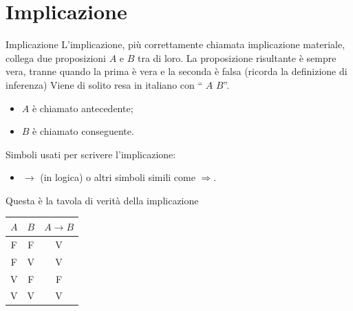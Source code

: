 \documentclass[10pt,dvipsnames,handout]{beamer}
\begin{document}



\section{Implicazione}

\begin{frame}{Implicazione}
    L'\alert{implicazione}, più correttamente chiamata \alert{implicazione materiale}, collega due proposizioni $A$ e $B$ tra di loro. La proposizione risultante è sempre vera, tranne quando la prima è vera e la seconda è falsa (ricorda la definizione di inferenza)
    \medskip
    Viene di solito resa in italiano con `` $A$  $B$''.
    \begin{itemize}
        \item $A$ è chiamato \alert{antecedente};
        \item $B$ è chiamato \alert{conseguente}.
    \end{itemize}

    \medskip
    Simboli usati per scrivere l'implicazione:
    \begin{itemize}
        \item \alert{$\to$ (in logica)} o altri simboli simili come $\Rightarrow$.
    \end{itemize}

    \pause
    \medskip
    Questa è la tavola di verità della implicazione

    \medskip
    \begin{center}
        \begin{tabular}{c|c||c}
            $A$ & $B$ & $A \to B$ \\
            \hline
            F   & F   & V         \\
            F   & V   & V         \\
            V   & F   & F         \\
            V   & V   & V
        \end{tabular}
    \end{center}
\end{frame}
\end{document}
